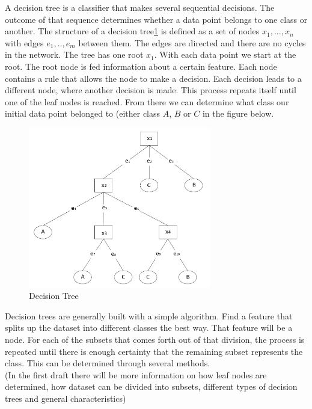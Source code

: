 A decision tree is a classifier that makes several sequential decisions. The outcome of that sequence determines whether a data point belongs to one class or another. The structure of a decision tree\ref{fig:DT} is defined as a set of nodes ${x_1, ... , x_n}$ with edges ${e_1, .., e_{m}}$ between them. The edges are directed and there are no cycles in the network. The tree has one root $x_1$. With each data point we start at the root. The root node is fed information about a certain feature. Each node contains a rule that allows the node to make a decision. Each decision leads to a different node, where another decision is made. This process repeats itself until one of the leaf nodes is reached\cite{safavian1991survey}. From there we can determine what class our initial data point belonged to (either class $A$, $B$ or $C$ in the figure below. 
\begin{figure}[H]
    \includegraphics[width=80mm]{./img/decisiontree.png}
    \caption{Decision Tree}
    \label{fig:DT}
\end{figure}

Decision trees are generally built with a simple algorithm. Find a feature that splits up the dataset into different classes the best way. That feature will be a node. For each of the subsets that comes forth out of that division, the process is repeated until there is enough certainty that the remaining subset represents the class. This can be determined through several methods. \\

(In the first draft there will be more information on how leaf nodes are determined, how dataset can be divided into subsets, different types of decision trees and general characteristics)